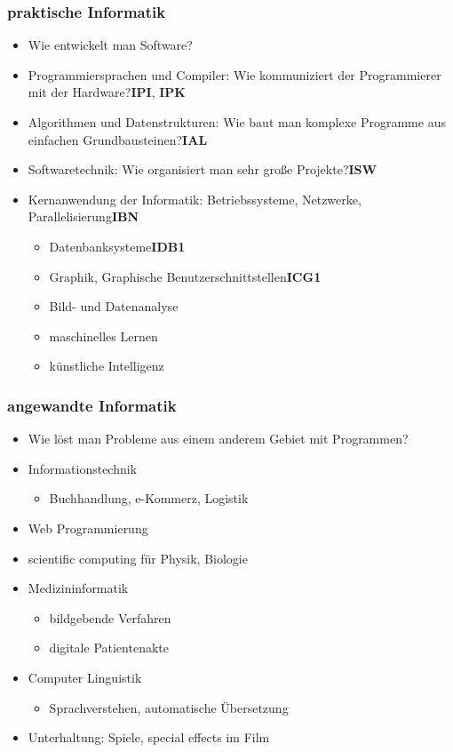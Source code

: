 \documentclass[a4paper]{scrartcl}
\theoremstyle{definition}
\theoremstyle{plain}
\theoremstyle{remark}
\theoremstyle{remark}
\begin{document}
\subsubsection{praktische Informatik}
\label{sec-1-1-3}
\begin{itemize}
\item Wie entwickelt man Software?
\item Programmiersprachen und Compiler: Wie kommuniziert der Programmierer mit der Hardware?\hfill \textbf{IPI}, \textbf{IPK}
\item Algorithmen und Datenstrukturen: Wie baut man komplexe Programme aus einfachen Grundbausteinen?\hfill \textbf{IAL}
\item Softwaretechnik: Wie organisiert man sehr große Projekte?\hfill \textbf{ISW}
\item Kernanwendung der Informatik: Betriebssysteme, Netzwerke, Parallelisierung\hfill \textbf{IBN}
\begin{itemize}
\item Datenbanksysteme\hfill \textbf{IDB1}
\item Graphik, Graphische Benutzerschnittstellen\hfill \textbf{ICG1}
\item Bild- und Datenanalyse
\item maschinelles Lernen
\item künstliche Intelligenz
\end{itemize}
\end{itemize}
\subsubsection{angewandte Informatik}
\label{sec-1-1-4}
\begin{itemize}
\item Wie löst man Probleme aus einem anderem Gebiet mit Programmen?
\item Informationstechnik
\begin{itemize}
\item Buchhandlung, e-Kommerz, Logistik
\end{itemize}
\item Web Programmierung
\item scientific computing für Physik, Biologie
\item Medizininformatik
\begin{itemize}
\item bildgebende Verfahren
\item digitale Patientenakte
\end{itemize}
\item Computer Linguistik
\begin{itemize}
\item Sprachverstehen, automatische Übersetzung
\end{itemize}
\item Unterhaltung: Spiele, special effects im Film
\end{itemize}
\end{document}
